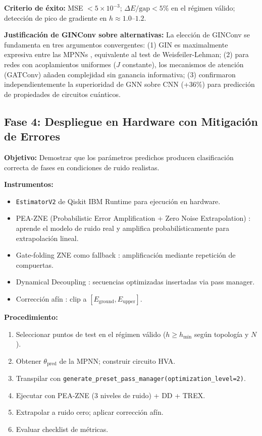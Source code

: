 \documentclass[11pt,a4paper,spanish]{book}
\begin{document}
\textbf{Criterio de éxito:} MSE $< 5 \times 10^{-3}$; $\Delta E/\text{gap} < 5\%$ en el régimen válido; detección de pico de gradiente en $h \approx 1.0$--$1.2$.

\textbf{Justificación de GINConv sobre alternativas:} La elección de GINConv se fundamenta en tres argumentos convergentes: (1) GIN es maximalmente expresiva entre las MPNNs \citep{xu2019}, equivalente al test de Weisfeiler-Lehman; (2) para redes con acoplamientos uniformes ($J$ constante), los mecanismos de atención (GATConv) añaden complejidad sin ganancia informativa; (3) \citet{meng2025} confirmaron independientemente la superioridad de GNN sobre CNN (+36\%) para predicción de propiedades de circuitos cuánticos.

\subsection{Fase 4: Despliegue en Hardware con Mitigación de Errores}

\textbf{Objetivo:} Demostrar que los parámetros predichos producen clasificación correcta de fases en condiciones de ruido realistas.

\textbf{Instrumentos:}
\begin{itemize}
    \item \texttt{EstimatorV2} de Qiskit IBM Runtime para ejecución en hardware.
    \item PEA-ZNE (Probabilistic Error Amplification + Zero Noise Extrapolation) \citep{kim2023}: aprende el modelo de ruido real y amplifica probabilísticamente para extrapolación lineal.
    \item Gate-folding ZNE como fallback \citep{uvarov2024}: amplificación mediante repetición de compuertas.
    \item Dynamical Decoupling \citep{pokharel2025}: secuencias optimizadas insertadas via pass manager.
    \item Corrección afín \citep{wang2024}: clip a $[E_{\text{ground}}, E_{\text{upper}}]$.
\end{itemize}

\textbf{Procedimiento:}
\begin{enumerate}
    \item Seleccionar puntos de test en el régimen válido ($h \geq h_{\min}$ según topología y $N$).
    \item Obtener $\theta_{\text{pred}}$ de la MPNN; construir circuito HVA.
    \item Transpilar con \texttt{generate\_preset\_pass\_manager(optimization\_level=2)}.
    \item Ejecutar con PEA-ZNE (3 niveles de ruido) + DD + TREX.
    \item Extrapolar a ruido cero; aplicar corrección afín.
    \item Evaluar checklist de métricas.
\end{enumerate}
\end{document}
